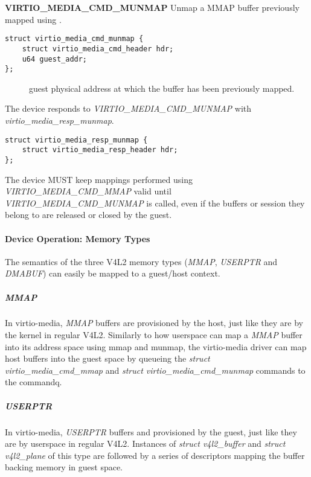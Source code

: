 \textbf{VIRTIO_MEDIA_CMD_MUNMAP} Unmap a MMAP buffer previously mapped using .

\begin{lstlisting}
struct virtio_media_cmd_munmap {
    struct virtio_media_cmd_header hdr;
    u64 guest_addr;
};
\end{lstlisting}

\begin{description}
\item[] guest physical address at which the buffer has been previously mapped.
\end{description}

The device responds to \textit{VIRTIO_MEDIA_CMD_MUNMAP} with \textit{virtio_media_resp_munmap}.

\begin{lstlisting}
struct virtio_media_resp_munmap {
    struct virtio_media_resp_header hdr;
};
\end{lstlisting}


The device MUST keep mappings performed using \textit{VIRTIO_MEDIA_CMD_MMAP}
valid until \textit{VIRTIO_MEDIA_CMD_MUNMAP} is called, even if the buffers or
session they belong to are released or closed by the guest.

\paragraph{Device Operation: Memory Types}

The semantics of the three V4L2 memory types (\textit{MMAP}, \textit{USERPTR}
and \textit{DMABUF}) can easily be mapped to a guest/host context.

\subparagraph{MMAP}

In virtio-media, \textit{MMAP} buffers are provisioned by the host, just like
they are by the kernel in regular V4L2. Similarly to how userspace can map a
\textit{MMAP} buffer into its address space using mmap and munmap, the
virtio-media driver can map host buffers into the guest space by queueing the
\textit{struct virtio_media_cmd_mmap} and \textit{struct virtio_media_cmd_munmap}
commands to the commandq.

\subparagraph{USERPTR}

In virtio-media, \textit{USERPTR} buffers and provisioned by the guest, just
like they are by userspace in regular V4L2. Instances of \textit{struct v4l2_buffer}
and \textit{struct v4l2_plane} of this type are followed by a series of
descriptors mapping the buffer backing memory in guest space.

